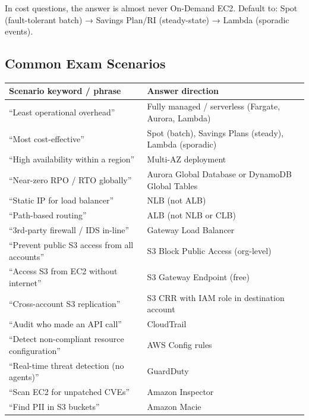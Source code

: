 \begin{examtip}
In cost questions, the answer is almost never On-Demand EC2. Default to:
Spot (fault-tolerant batch) → Savings Plan/RI (steady-state) → Lambda (sporadic events).
\end{examtip}

\subsection{Common Exam Scenarios}

\begin{comparebox}[title={Scenario keyword → correct answer mapping}]
\begin{tabular}{@{}p{5.5cm}p{6cm}@{}}
\toprule
\textbf{Scenario keyword / phrase} & \textbf{Answer direction} \\
\midrule
``Least operational overhead'' & Fully managed / serverless (Fargate, Aurora, Lambda) \\[3pt]
``Most cost-effective'' & Spot (batch), Savings Plans (steady), Lambda (sporadic) \\[3pt]
``High availability within a region'' & Multi-AZ deployment \\[3pt]
``Near-zero RPO / RTO globally'' & Aurora Global Database or DynamoDB Global Tables \\[3pt]
``Static IP for load balancer'' & NLB (not ALB) \\[3pt]
``Path-based routing'' & ALB (not NLB or CLB) \\[3pt]
``3rd-party firewall / IDS in-line'' & Gateway Load Balancer \\[3pt]
``Prevent public S3 access from all accounts'' & S3 Block Public Access (org-level) \\[3pt]
``Access S3 from EC2 without internet'' & S3 Gateway Endpoint (free) \\[3pt]
``Cross-account S3 replication'' & S3 CRR with IAM role in destination account \\[3pt]
``Audit who made an API call'' & CloudTrail \\[3pt]
``Detect non-compliant resource configuration'' & AWS Config rules \\[3pt]
``Real-time threat detection (no agents)'' & GuardDuty \\[3pt]
``Scan EC2 for unpatched CVEs'' & Amazon Inspector \\[3pt]
``Find PII in S3 buckets'' & Amazon Macie \\[3pt]

\end{tabular}
\end{comparebox}
